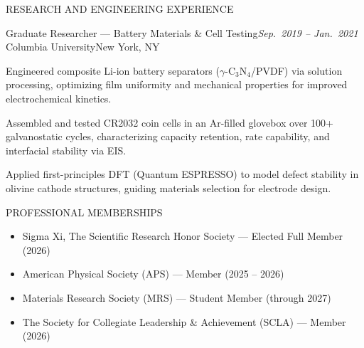 \documentclass{resume}
\begin{document}
\begin{rSection}{RESEARCH AND ENGINEERING EXPERIENCE}
\begin{rSubsection}
    {Graduate Researcher --- Battery Materials \& Cell Testing}{\em Sep.\ 2019 -- Jan.\ 2021}
    {Columbia University}{New York, NY}
\item Engineered composite Li-ion battery separators ($\gamma$-C$_3$N$_4$/PVDF) via solution processing, optimizing film uniformity and mechanical properties for improved electrochemical kinetics.
\item Assembled and tested CR2032 coin cells in an Ar-filled glovebox over 100+ galvanostatic cycles, characterizing capacity retention, rate capability, and interfacial stability via EIS.
\item Applied first-principles DFT (Quantum ESPRESSO) to model defect stability in olivine cathode structures, guiding materials selection for electrode design.
\end{rSubsection}

\end{rSection}


\begin{rSection}{PROFESSIONAL MEMBERSHIPS}
\begin{itemize}
\itemsep 0.05em
\item Sigma Xi, The Scientific Research Honor Society --- Elected Full Member (2026)
\item American Physical Society (APS) --- Member (2025 -- 2026)
\item Materials Research Society (MRS) --- Student Member (through 2027)
\item The Society for Collegiate Leadership \& Achievement (SCLA) --- Member (2026)
\end{itemize}
\end{rSection}

\end{document}

